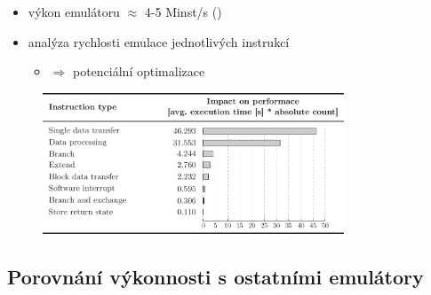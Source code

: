 \documentclass[compress]{beamer}
\begin{document}
\begin{frame}
	\begin{itemize}
		\item výkon emulátoru $\approx$ 4-5 Minst/s (\href{https://github.com/MartinUbl/KIV-RTOS}{})
		\item analýza rychlosti emulace jednotlivých instrukcí
		\begin{itemize}
			\item $\Rightarrow$ potenciální optimalizace
		\end{itemize}
	\end{itemize}
	\begin{figure}
		\centering
		\includegraphics[width=0.8\textwidth]{img/performance_2.pdf}
	\end{figure}
\end{frame}

\subsection{Porovnání výkonnosti s ostatními emulátory}
\end{document}
